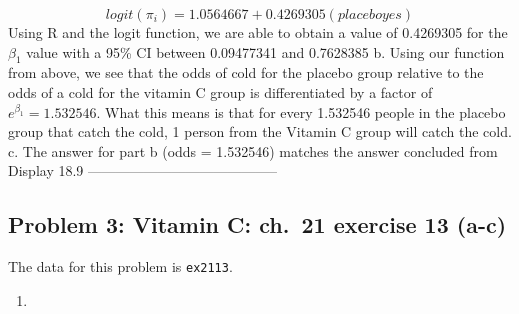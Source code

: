 \documentclass[
]{article}
\begin{document}
\[logit(\pi_{i}) = 1.0564667 + 0.4269305(placeboyes)\] Using R and the
logit function, we are able to obtain a value of 0.4269305 for the
\(\beta_{1}\) value with a 95\% CI between 0.09477341 and 0.7628385
\newline \newline b. \newline Using our function from above, we see that
the odds of cold for the placebo group relative to the odds of a cold
for the vitamin C group is differentiated by a factor of
\(e^{\beta_{1}} = 1.532546\). What this means is that for every 1.532546
people in the placebo group that catch the cold, 1 person from the
Vitamin C group will catch the cold. \newline \newline c. \newline The
answer for part b (odds = 1.532546) matches the answer concluded from
Display 18.9 -----------------------------------------

\hypertarget{problem-3-vitamin-c-ch.-21-exercise-13-a-c}{%
\subsection{Problem 3: Vitamin C: ch.~21 exercise 13
(a-c)}\label{problem-3-vitamin-c-ch.-21-exercise-13-a-c}}

The data for this problem is \texttt{ex2113}.

\begin{enumerate}
\def\labelenumi{\alph{enumi}.}
\item
  \newline
\end{enumerate}
\end{document}
